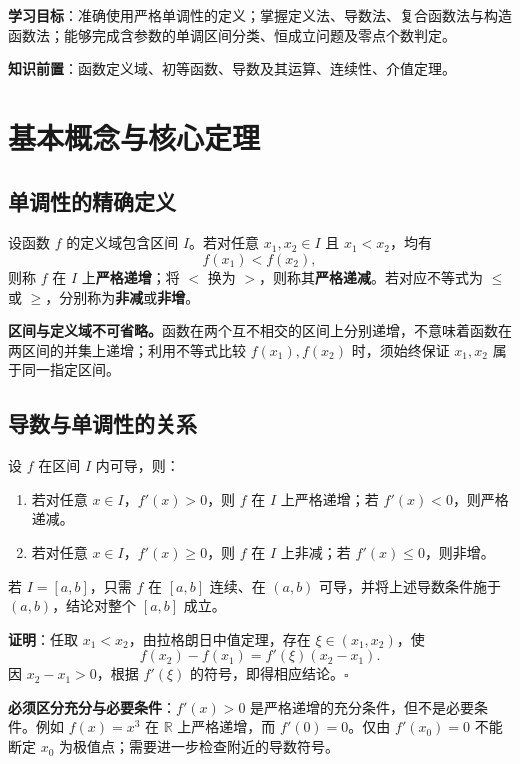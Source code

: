 \booktitle
\tableofcontents
\medskip
\noindent\textbf{学习目标}：准确使用严格单调性的定义；掌握定义法、导数法、复合函数法与构造函数法；能够完成含参数的单调区间分类、恒成立问题及零点个数判定。

\noindent\textbf{知识前置}：函数定义域、初等函数、导数及其运算、连续性、介值定理。

\section{基本概念与核心定理}

\subsection{单调性的精确定义}
设函数 $f$ 的定义域包含区间 $I$。若对任意 $x_1,x_2\in I$ 且 $x_1<x_2$，均有
\[
 f(x_1)<f(x_2),
\]
则称 $f$ 在 $I$ 上\textbf{严格递增}；将 $<$ 换为 $>$，则称其\textbf{严格递减}。若对应不等式为 $\le$ 或 $\ge$，分别称为\textbf{非减}或\textbf{非增}。

\begin{knowledgebox}
\textbf{区间与定义域不可省略。}函数在两个互不相交的区间上分别递增，不意味着函数在两区间的并集上递增；利用不等式比较 $f(x_1),f(x_2)$ 时，须始终保证 $x_1,x_2$ 属于同一指定区间。
\end{knowledgebox}

\subsection{导数与单调性的关系}
\begin{knowledgebox}[title=定理 1：一阶导数判定]
设 $f$ 在区间 $I$ 内可导，则：
\begin{enumerate}[label=(\arabic*)]
\item 若对任意 $x\in I$，$f'(x)>0$，则 $f$ 在 $I$ 上严格递增；若 $f'(x)<0$，则严格递减。
\item 若对任意 $x\in I$，$f'(x)\ge 0$，则 $f$ 在 $I$ 上非减；若 $f'(x)\le 0$，则非增。
\end{enumerate}
若 $I=[a,b]$，只需 $f$ 在 $[a,b]$ 连续、在 $(a,b)$ 可导，并将上述导数条件施于 $(a,b)$，结论对整个 $[a,b]$ 成立。
\end{knowledgebox}

\textbf{证明}：任取 $x_1<x_2$，由拉格朗日中值定理，存在 $\xi\in(x_1,x_2)$，使
\[
 f(x_2)-f(x_1)=f'(\xi)(x_2-x_1).
\]
因 $x_2-x_1>0$，根据 $f'(\xi)$ 的符号，即得相应结论。$\square$

\begin{methodbox}
\textbf{必须区分充分与必要条件}：$f'(x)>0$ 是严格递增的充分条件，但不是必要条件。例如 $f(x)=x^3$ 在 $\mathbb R$ 上严格递增，而 $f'(0)=0$。仅由 $f'(x_0)=0$ 不能断定 $x_0$ 为极值点；需要进一步检查附近的导数符号。
\end{methodbox}


